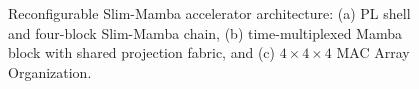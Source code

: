 \documentclass[lettersize,journal]{IEEEtran}
\begin{document}





\begin{figure}[!t]
\centering

\caption{Reconfigurable Slim-Mamba accelerator architecture: (a) PL shell and four-block Slim-Mamba
chain, (b) time-multiplexed Mamba block with shared projection fabric, and (c) $4\times4\times4$ MAC Array Organization.}
\label{fig:hardware_architecture}
\end{figure}
\end{document}
